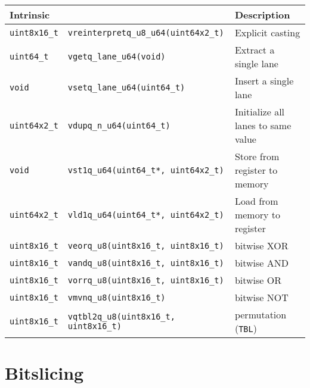 \begin{table}[h!]
    \centering
    \footnotesize
    \begin{tabularx}{\textwidth}{ll|X}
        Intrinsic && Description \\
        \hline
        \texttt{uint8x16\_t} & \texttt{vreinterpretq\_u8\_u64(uint64x2\_t)} & Explicit casting \\
        \hline
        \texttt{uint64\_t} & \texttt{vgetq\_lane\_u64(void)} & Extract a single lane \\
        \hline
        \texttt{void} & \texttt{vsetq\_lane\_u64(uint64\_t)} & Insert a single lane \\
        \hline
        \texttt{uint64x2\_t} & \texttt{vdupq\_n\_u64(uint64\_t)} & Initialize all lanes to same value \\
        \hline
        \texttt{void} & \texttt{vst1q\_u64(uint64\_t*, uint64x2\_t)} & Store from register to memory \\
        \hline
        \texttt{uint64x2\_t} & \texttt{vld1q\_u64(uint64\_t*, uint64x2\_t)} & Load from memory to register \\
        \hline
        \texttt{uint8x16\_t} & \texttt{veorq\_u8(uint8x16\_t, uint8x16\_t)} & bitwise XOR \\
        \hline
        \texttt{uint8x16\_t} & \texttt{vandq\_u8(uint8x16\_t, uint8x16\_t)} & bitwise AND \\
        \hline
        \texttt{uint8x16\_t} & \texttt{vorrq\_u8(uint8x16\_t, uint8x16\_t)} & bitwise OR \\
        \hline
        \texttt{uint8x16\_t} & \texttt{vmvnq\_u8(uint8x16\_t)} & bitwise NOT \\
        \hline
        \texttt{uint8x16\_t} & \texttt{vqtbl2q\_u8(uint8x16\_t, uint8x16\_t)} & permutation (\texttt{TBL}) \\
    \end{tabularx}
\end{table}

\section{Bitslicing}


